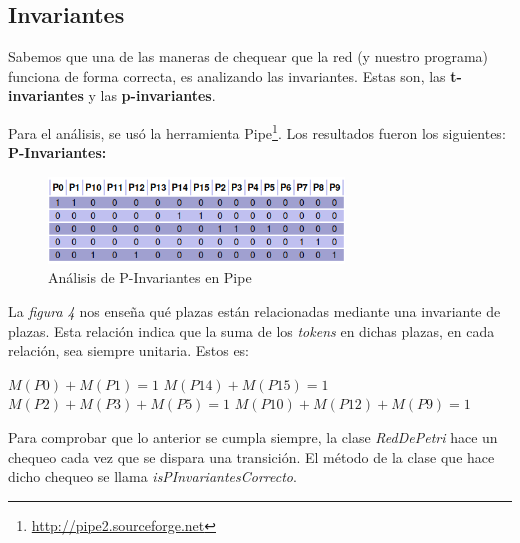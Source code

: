 \documentclass{article}
\newcommand{\fnpipe}{\url{http://pipe2.sourceforge.net}}
\begin{document}
    \subsection{Invariantes}
    Sabemos que una de las maneras de chequear que la red (y nuestro programa) funciona 
    de forma correcta, es analizando las invariantes. Estas son, las \textbf{t-invariantes}
    y las \textbf{p-invariantes}. \par
    Para el análisis, se usó la herramienta Pipe\footnote{\fnpipe}.
    Los resultados fueron los siguientes: \newline \newline
    \textbf{P-Invariantes:} \\
    \begin{figure}[H]
        \includegraphics[width=0.7\textwidth, center]{p-invariante.png}
        \caption{Análisis de P-Invariantes en Pipe}
    \end{figure}
    La \emph{figura 4} nos enseña qué plazas están relacionadas mediante una invariante de
    plazas. Esta relación indica que la suma de los \emph{tokens} en dichas plazas, en cada
    relación, sea siempre unitaria. Estos es: \newline \newline
    \begin{center}
        $M(P0) + M(P1) = 1$ \newline \newline
        $M(P14) + M(P15) = 1$ \newline \newline
        $M(P2) + M(P3) + M(P5) = 1$ \newline \newline
        $M(P10) + M(P12) + M(P9) = 1$ \newline \newline
    \end{center} \par
    Para comprobar que lo anterior se cumpla siempre, la clase \emph{RedDePetri} hace un 
    chequeo cada vez que se dispara una transición. El método de la clase que hace dicho
    chequeo se llama \emph{isPInvariantesCorrecto}. \newline \newline
\end{document}
